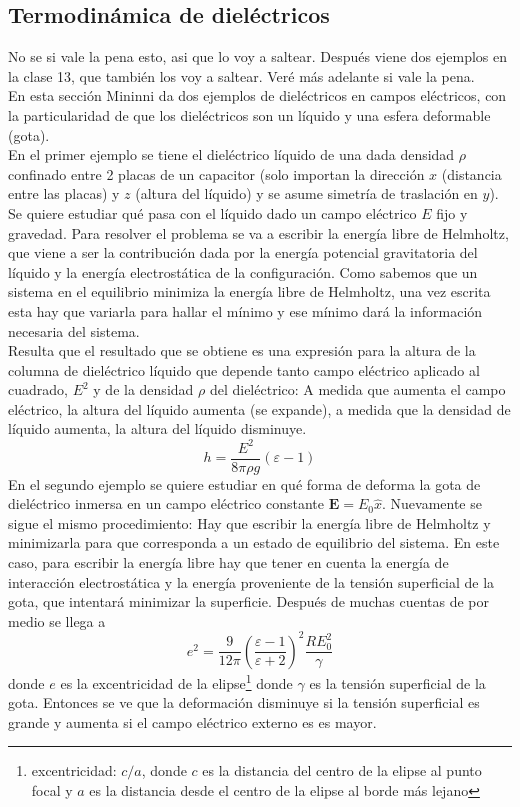 \subsection{Termodinámica de dieléctricos}
No se si vale la pena esto, asi que lo voy a saltear. Después viene dos ejemplos en la clase 13, que también los voy a saltear. Veré más adelante si vale la pena.\\
\indent En esta sección Mininni da dos ejemplos de dieléctricos en campos eléctricos, con la particularidad de que los dieléctricos son un líquido y una esfera deformable (gota).\\
\indent En el primer ejemplo se tiene el dieléctrico líquido de una dada densidad $\rho$ confinado entre 2 placas de un capacitor (solo importan la dirección $x$ (distancia entre las placas) y $z$ (altura del líquido) y se asume simetría de traslación en $y$). Se quiere estudiar qué pasa con el líquido dado un campo eléctrico $E$ fijo y gravedad. Para resolver el problema se va a escribir la energía libre de Helmholtz, que viene a ser la contribución dada por la energía potencial gravitatoria del líquido y la energía electrostática de la configuración. Como sabemos que un sistema en el equilibrio minimiza la energía libre de Helmholtz, una vez escrita esta hay que variarla para hallar el mínimo y ese mínimo dará la información necesaria del sistema.\\
\indent Resulta que el resultado que se obtiene es una expresión para la altura de la columna de dieléctrico líquido que depende tanto campo eléctrico aplicado al cuadrado, $E^{2}$ y de la densidad $\rho$ del dieléctrico: A medida que aumenta el campo eléctrico, la altura del líquido aumenta (se expande), a medida que la densidad de líquido aumenta, la altura del líquido disminuye.
\begin{equation*}
    h = \frac{E^{2}}{8\pi \rho g}(\varepsilon-1)
\end{equation*}
En el segundo ejemplo se quiere estudiar en qué forma de deforma la gota de dieléctrico inmersa en un campo eléctrico constante $\textbf{E} = E_{0}\hat{x}$. Nuevamente se sigue el mismo procedimiento: Hay que escribir la energía libre de Helmholtz y minimizarla para que corresponda a un estado de equilibrio del sistema. En este caso, para escribir la energía libre hay que tener en cuenta la energía de interacción electrostática y la energía proveniente de la tensión superficial de la gota, que intentará minimizar la superficie. Después de muchas cuentas de por medio se llega a
\begin{equation*}
    e^{2} = \frac{9}{12\pi}
    \left(
        \frac{\varepsilon-1}{\varepsilon+2}
    \right)^{2}
    \frac{RE_{0}^{2}}{\gamma}
\end{equation*}
donde $e$ es la excentricidad de la elipse\footnote{excentricidad: $c/a$, donde $c$ es la distancia del centro de la elipse al punto focal y $a$ es la distancia desde el centro de la elipse al borde más lejano} donde $\gamma$ es la tensión superficial de la gota. Entonces se ve que la deformación disminuye si la tensión superficial es grande y aumenta si el campo eléctrico externo es es mayor.


